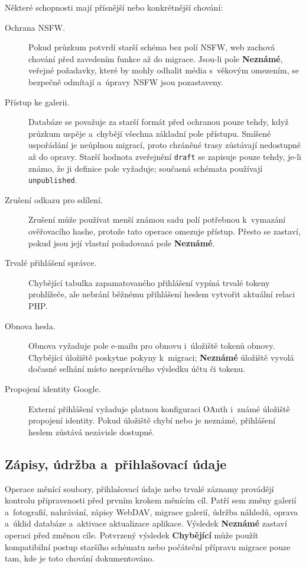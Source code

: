 \documentclass[11pt,a4paper]{article}
\newcommand{\ui}[1]{\textbf{#1}}
\newcommand{\codeword}[1]{\nolinkurl{#1}}
\begin{document}
Některé schopnosti mají přísnější nebo konkrétnější chování:

\begin{description}
  \item[Ochrana NSFW.] Pokud průzkum potvrdí starší schéma bez polí NSFW, web
  zachová chování před zavedením funkce až do migrace. Jsou-li pole
  \ui{Neznámé}, veřejné požadavky, které by mohly odhalit média s~věkovým
  omezením, se bezpečně odmítají a~úpravy NSFW jsou pozastaveny.
  \item[Přístup ke galerii.] Databáze se považuje za starší formát před ochranou
  pouze tehdy, když průzkum uspěje a~chybějí všechna základní pole přístupu.
  Smíšené uspořádání je neúplnou migrací, proto chráněné trasy zůstávají
  nedostupné až do opravy. Starší hodnota zveřejnění \codeword{draft} se
  zapisuje pouze tehdy, je-li známo, že ji definice pole vyžaduje; současná
  schémata používají \codeword{unpublished}.
  \item[Zrušení odkazu pro sdílení.] Zrušení může používat menší známou sadu
  polí potřebnou k~vymazání ověřovacího hashe, protože tato operace omezuje
  přístup. Přesto se zastaví, pokud jsou její vlastní požadovaná pole
  \ui{Neznámé}.
  \item[Trvalé přihlášení správce.] Chybějící tabulka zapamatovaného přihlášení
  vypíná trvalé tokeny prohlížeče, ale nebrání běžnému přihlášení heslem
  vytvořit aktuální relaci PHP.
  \item[Obnova hesla.] Obnova vyžaduje pole e-mailu pro obnovu i~úložiště tokenů
  obnovy. Chybějící úložiště poskytne pokyny k~migraci; \ui{Neznámé} úložiště
  vyvolá dočasné selhání místo nesprávného výsledku účtu či tokenu.
  \item[Propojení identity Google.] Externí přihlášení vyžaduje platnou
  konfiguraci OAuth i~známé úložiště propojení identity. Pokud úložiště chybí
  nebo je neznámé, přihlášení heslem zůstává nezávisle dostupné.
\end{description}

\subsection{Zápisy, údržba a~přihlašovací údaje}

Operace měnící soubory, přihlašovací údaje nebo trvalé záznamy provádějí
kontrolu připravenosti před prvním krokem měnícím cíl. Patří sem změny galerií
a~fotografií, nahrávání, zápisy WebDAV, migrace galerií, údržba náhledů, oprava
a~úklid databáze a~aktivace aktualizace aplikace. Výsledek \ui{Neznámé} zastaví
operaci před změnou cíle. Potvrzený výsledek \ui{Chybějící} může použít
kompatibilní postup staršího schématu nebo počáteční přípravu migrace pouze tam,
kde je toto chování dokumentováno.
\end{document}
